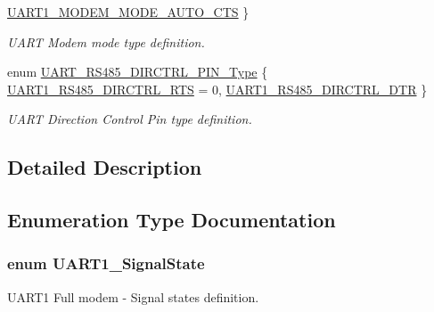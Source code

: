 \begin{DoxyCompactItemize}
\hyperlink{group___u_a_r_t___public___types_gga55fc73bec4c58ad15d24b05095c4523aaa290490ac4ee52b4fd0d2a89b038ac0e}{U\+A\+R\+T1\+\_\+\+M\+O\+D\+E\+M\+\_\+\+M\+O\+D\+E\+\_\+\+A\+U\+T\+O\+\_\+\+C\+TS}
 \}\begin{DoxyCompactList}\small\item\em U\+A\+RT Modem mode type definition. \end{DoxyCompactList}
\item 
enum \hyperlink{group___u_a_r_t___public___types_gabcfaaf12f325112107ff9b5c5cf1120c}{U\+A\+R\+T\+\_\+\+R\+S485\+\_\+\+D\+I\+R\+C\+T\+R\+L\+\_\+\+P\+I\+N\+\_\+\+Type} \{ \hyperlink{group___u_a_r_t___public___types_ggabcfaaf12f325112107ff9b5c5cf1120ca8f2c8ec98f2fb7e26516974a08fc2885}{U\+A\+R\+T1\+\_\+\+R\+S485\+\_\+\+D\+I\+R\+C\+T\+R\+L\+\_\+\+R\+TS} = 0, 
\hyperlink{group___u_a_r_t___public___types_ggabcfaaf12f325112107ff9b5c5cf1120cad58cd4cd834d89b139816c0cd3138582}{U\+A\+R\+T1\+\_\+\+R\+S485\+\_\+\+D\+I\+R\+C\+T\+R\+L\+\_\+\+D\+TR}
 \}\begin{DoxyCompactList}\small\item\em U\+A\+RT Direction Control Pin type definition. \end{DoxyCompactList}
\end{DoxyCompactItemize}


\subsection{Detailed Description}


\subsection{Enumeration Type Documentation}
\subsubsection[{\texorpdfstring{U\+A\+R\+T1\+\_\+\+Signal\+State}{UART1_SignalState}}]{\setlength{\rightskip}{0pt plus 5cm}enum {\bf U\+A\+R\+T1\+\_\+\+Signal\+State}}\hypertarget{group___u_a_r_t___public___types_gada493f726a4ea247b209b49fb8c85a52}{}\label{group___u_a_r_t___public___types_gada493f726a4ea247b209b49fb8c85a52}


U\+A\+R\+T1 Full modem -\/ Signal states definition. 

